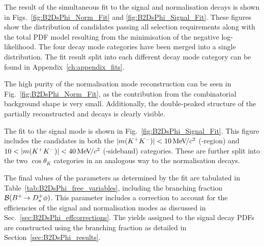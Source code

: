 The result of the simultaneous fit to the signal and normalisation decays is shown in Figs.~\ref{fig:B2DsPhi_Norm_Fit} and \ref{fig:B2DsPhi_Signal_Fit}. These figures show the distribution of candidates passing all selection requirements along with the total PDF model resulting from the minimisation of the negative log-likelihood. The four \Dsp decay mode categories have been merged into a single distribution. The fit result split into each different \Dsp decay mode category can be found in Appendix~\ref{ch:appendix_fits}.

The high purity of the normalisation mode reconstruction can be seen in Fig.~\ref{fig:B2DsPhi_Norm_Fit}, as the contribution from the combinatorial background shape is very small. Additionally, the double-peaked structure of the partially reconstructed \decay{\Bp}{\Dssp\Dzb} and \decay{\Bp}{\Dsp\Dstarzb} decays is clearly visible. 



The fit to the signal mode is shown in Fig.~\ref{fig:B2DsPhi_Signal_Fit}. This figure includes the \decay{\Bp}{\Dsp\phiz} candidates in both the $|m({{K}^+}{{K}^-})| < 10{\mathrm{\,Me\kern -0.1em V\!/}c^2}$ (\phiz-region) and $10< |m({{K}^+}{{K}^-})| < 40{\mathrm{\,Me\kern -0.1em V\!/}c^2}$ (\phiz-sideband) categories. These are further split into the two $\cos\theta_{K}$ categories in an analogous way to the normalisation decays.



The final values of the parameters as determined by the fit are tabulated in Table~\ref{tab:B2DsPhi_free_variables}, including the branching fraction ${\mathcal{B}}({{{B}^+}}\!\rightarrow {\ensuremath{{D}^+_{s}}}\phi)$. This parameter includes a correction to account for the efficiencies of the signal and normalisation modes as discussed in Sec.~\ref{sec:B2DsPhi_effcorrections}. The yields assigned to the signal decay PDFs are constructed using the branching fraction as detailed in Section~\ref{sec:B2DsPhi_results}. 


